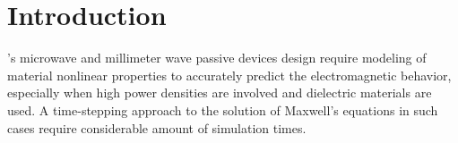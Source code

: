 \documentclass[journal]{IEEEtran}
\begin{document}
%
\IEEEpeerreviewmaketitle



\section{Introduction}
% 
% 
% 
% 
% 
's microwave and millimeter wave passive devices design require modeling of material nonlinear properties to accurately predict the electromagnetic behavior, especially when high power densities are involved and dielectric materials are used. 
A time-stepping approach to the solution of Maxwell's equations in such cases require considerable amount of simulation times. %
\end{document}
